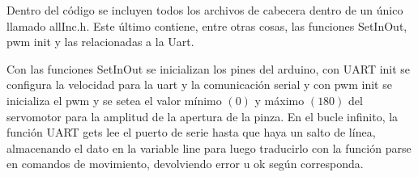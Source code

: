 Dentro del código se incluyen todos los archivos de cabecera dentro de un único llamado allInc.h. 
Este último contiene, entre otras cosas, las funciones SetInOut, pwm init y las relacionadas a la Uart.
\par
Con las funciones SetInOut se inicializan los pines del arduino, con UART init 
se configura la velocidad para la uart y la comunicación serial y con pwm init 
se inicializa el pwm y se setea el valor mínimo $(0)$ y máximo $(180)$ del 
servomotor para la amplitud de la apertura de la pinza.
En el bucle infinito, la función UART gets lee el puerto de serie hasta que 
haya un salto de línea, almacenando el dato en la variable line para luego 
traducirlo con la función parse en comandos de movimiento, devolviendo error u 
ok según corresponda.

